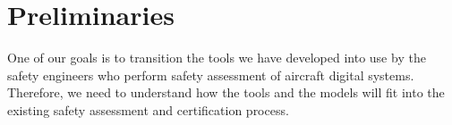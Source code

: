\section{Preliminaries}
\label{sec:prelims}
One of our goals is to transition the tools we have developed into use by the safety engineers who perform safety assessment of aircraft digital systems. Therefore, we need to understand how the tools and the models will fit into the existing safety assessment and certification process.






%

%




